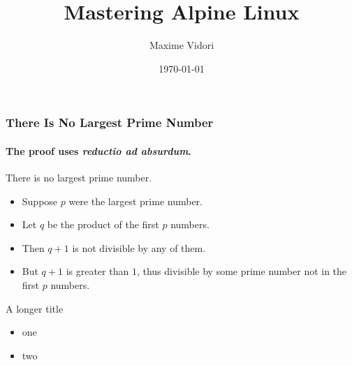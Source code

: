 \documentclass{beamer}
\title{Mastering Alpine Linux}
\date{\today}
\author{Maxime Vidori}
\begin{document}
\begin{frame}
\titlepage
\end{frame}


\begin{frame}
\frametitle{There Is No Largest Prime Number}
\framesubtitle{The proof uses \textit{reductio ad absurdum}.}
\begin{theorem}
There is no largest prime number. \end{theorem}
\begin{itemize}
\item<1-> Suppose $p$ were the largest prime number.
\item<2-> Let $q$ be the product of the first $p$ numbers.
\item<3-> Then $q+1$ is not divisible by any of them.
\item<1-> But $q + 1$ is greater than $1$, thus divisible by some prime
number not in the first $p$ numbers.
\end{itemize}
\end{frame}

\begin{frame}{A longer title}
\begin{itemize}
\item one
\item two
\end{itemize}
\end{frame}
\end{document}
